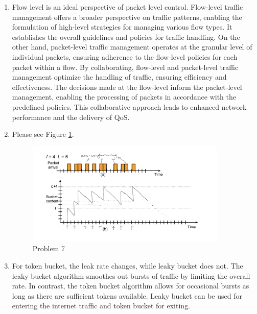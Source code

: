 \documentclass{article}
\begin{document}
\begin{enumerate}
    \item
    Flow level is an ideal perspective of packet level control. Flow-level traffic management offers a broader perspective on traffic patterns, enabling the formulation of high-level strategies for managing various flow types. It establishes the overall guidelines and policies for traffic handling. On the other hand, packet-level traffic management operates at the granular level of individual packets, ensuring adherence to the flow-level policies for each packet within a flow. By collaborating, flow-level and packet-level traffic management optimize the handling of traffic, ensuring efficiency and effectiveness. The decisions made at the flow-level inform the packet-level management, enabling the processing of packets in accordance with the predefined policies. This collaborative approach leads to enhanced network performance and the delivery of QoS.
    
    \item
        Please see Figure \ref{fig:fro}.
    \begin{figure}
        \centering
        \includegraphics[width=0.9\textwidth]{h5ex7.jpg}
        \caption{\label{fig:fro}Problem 7}
    \end{figure}
    
    \item
    For token bucket, the leak rate changes, while leaky bucket does not. The leaky bucket algorithm smoothes out bursts of traffic by limiting the overall rate. In contrast, the token bucket algorithm allows for occasional bursts as long as there are sufficient tokens available. Leaky bucket can be used for entering the internet traffic and token bucket for exiting.
    
    
    
\end{enumerate}
\end{document}
